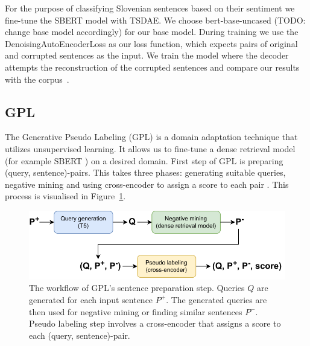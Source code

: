 \documentclass[fleqn,moreauthors,10pt]{ds_report}
\begin{document}
For the purpose of classifying Slovenian sentences based on their sentiment we fine-tune the SBERT model with TSDAE. We choose bert-base-uncased (TODO: change base model accordingly) for our base model. During training we use the DenoisingAutoEncoderLoss as our loss function, which expects pairs of original and corrupted sentences as the input. We train the model where the decoder attempts the reconstruction of the corrupted sentences and compare our results with the corpus~\cite{SentenceTransformers}.



\subsection*{GPL}

The Generative Pseudo Labeling (GPL) is a domain adaptation technique that utilizes unsupervised learning. It allows us to fine-tune a dense retrieval model (for example SBERT \cite{SBERT}) on a desired domain. First step of GPL is preparing (query, sentence)-pairs. This takes three phases: generating suitable queries, negative mining and using cross-encoder to assign a score to each pair \cite{GPL}. This process is visualised in Figure~\ref{fig:GPL}.

\begin{figure}[ht]\centering
	\vspace{12 pt}
	\includegraphics[width=\linewidth]{GPL_data_preprocessing.pdf}
	\vspace{5 pt}
	\caption{The workflow of GPL's sentence preparation step. Queries $Q$ are generated for each input sentence $P^{+}$. The generated queries are then used for negative mining or finding similar sentences $P^{-}$. Pseudo labeling step involves a cross-encoder that assigns a score to each (query, sentence)-pair.}
	\label{fig:GPL}
\end{figure}
\end{document}
